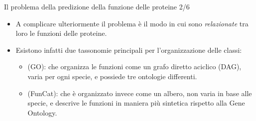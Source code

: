 \documentclass{beamer}
\begin{document}
\begin{tframe}{\small Il problema della predizione della funzione delle proteine 2/6}
\begin{itemize}
\item A complicare ulteriormente il problema è il modo in cui sono \emph{relazionate} tra loro le funzioni delle proteine.
\item Esistono infatti due tassonomie principali per l'organizzazione delle classi:
\begin{itemize}

\item {} (GO):  che organizza le funzioni come un grafo diretto aciclico (DAG), varia per ogni specie, e possiede tre ontologie differenti.
\item {} (FunCat): che è organizzato invece come un albero, non varia in base alle specie, e descrive le funzioni in maniera più sintetica rispetto alla Gene Ontology.
\end{itemize}

\end{itemize}  

\end{tframe}
\end{document}
